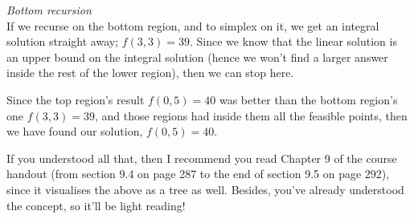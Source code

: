 \begin{enumerate}
\begin{description}
  \item \textit{Bottom recursion}\\
  If we recurse on the bottom region, and to simplex on it, we get an integral
  solution straight away; $f(3,3) = 39$. Since we know that the linear solution
  is an upper bound on the integral solution (hence we won't find a larger
  answer inside the rest of the lower region), then we can stop here.
  \end{description}

  Since the top region's result $f(0,5) = 40$ was better than the bottom
  region's one $f(3,3) = 39$, and those regions had inside them all the
  feasible points, then we have found our solution, $f(0,5) = 40$.

  If you understood all that, then I recommend you read Chapter 9 of the course
  handout (from section 9.4 on page 287 to the end of section 9.5 on page 292),
  since it visualises the above as a tree as well. Besides, you've already
  understood the concept, so it'll be light reading!

\end{enumerate}
